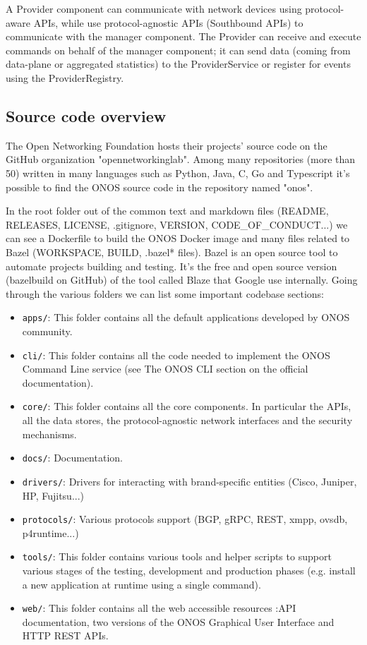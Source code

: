 \documentclass[a4paper,10pt]{memoir}
\begin{document}
A Provider component can communicate with network devices using protocol-aware APIs, while use protocol-agnostic APIs (Southbound APIs) to communicate with the manager component. The Provider can receive and execute commands on behalf of the manager component; it can send data (coming from data-plane or aggregated statistics) to the ProviderService or register for events using the ProviderRegistry.

\subsection{Source code overview}

The Open Networking Foundation hosts their projects' source code on the GitHub organization "opennetworkinglab". Among many repositories (more than 50) written in many languages such as Python, Java, C, Go and Typescript it's possible to find the ONOS source code in the repository named "onos".

In the root folder out of the common text and markdown files (README, RELEASES, LICENSE, .gitignore, VERSION, CODE\_OF\_CONDUCT...) we can see a Dockerfile to build the ONOS Docker image and many files related to Bazel (WORKSPACE, BUILD, .bazel* files). Bazel is an open source tool to automate projects building and testing. It's the free and open source version (bazelbuild on GitHub) of the tool called Blaze that Google use internally. 
Going through the various folders we can list some important codebase sections:
\begin{itemize}
    \item\texttt{apps/}: This folder contains all the default applications developed by ONOS community.
    \item\texttt{cli/}: This folder contains all the code needed to implement the ONOS Command Line service (see The ONOS CLI section on the official documentation). 
    \item\texttt{core/}: This folder contains all the core components. In particular the APIs, all the data stores, the protocol-agnostic network interfaces and the security mechanisms.  
    \item\texttt{docs/}: Documentation.
    \item\texttt{drivers/}: Drivers for interacting with brand-specific entities (Cisco, Juniper, HP, Fujitsu...)
    \item\texttt{protocols/}: Various protocols support (BGP, gRPC, REST, xmpp, ovsdb, p4runtime...)
    \item\texttt{tools/}: This folder contains various tools and helper scripts to support various stages of the testing, development and production phases (e.g. install a new application at runtime using a single command).
    \item\texttt{web/}: This folder contains all the web accessible resources :API documentation, two versions of the ONOS Graphical User Interface and HTTP REST APIs.
\end{itemize}
\end{document}
